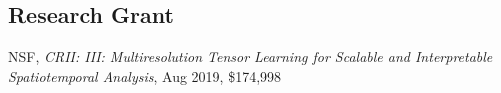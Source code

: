 \documentclass[margin,line]{res}
\begin{document}
\begin{resume}
%
%
% 
%
%
%
% 
% 
% 
%
%
% 
%
%
%
%
% 
% 
% 
% 


 \section{\sc Research Grant}
 \begin{enumerate}[label={[G\arabic*]}]
%
 \item NSF, \textit{CRII: III: Multiresolution Tensor Learning for Scalable and Interpretable Spatiotemporal Analysis},  Aug 2019, \$174,998



\end{enumerate}
\end{resume}
\end{document}
